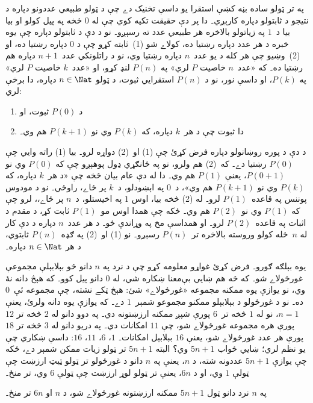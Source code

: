 \documentclass[../../../include/open-logic-section]{subfiles}
\begin{document}


په تر ټولو ساده بڼه کښې استقرا يو داسې تخنيک دے چې د ټولو
طبيعي عددونو دپاره د نتيجو د ثابتولو دپاره کارېږي۔ دا پر دې
حقيقت تکيه کوي چې له $0$ څخه په پيل کولو او بيا بيا د~$1$ په
زياتولو بالاخره هر طبيعي عدد ته رسېږو۔ نو د دې د ثابتولو
دپاره چې يوه خبره د هر عدد دپاره رښتيا ده، کولاے شو (1)~ثابته
کړو چې د $0$ دپاره رښتيا ده، او (2)~وښيو چې هر کله د يو
عدد~$n$ دپاره رښتيا وي، نو د راتلونکي عدد~$n+1$ دپاره هم
رښتيا ده۔ که «عدد~$n$ خاصيت $P$ لري» په $P(n)$ لنډ کړو، او
«عدد~$k$ خاصيت $P$ لري» په $P(k)$، او داسې نور، نو د $P(n)$
استقرايي ثبوت، د ټولو $n \in \Nat$ دپاره، دا برخې لري:
\begin{enumerate}
\item د $P(0)$ ثبوت، او
\item دا ثبوت چې د هر~$k$ دپاره، که $P(k)$ وي نو $P(k+1)$ هم وي۔
\end{enumerate}
د دې د پوره روښانولو دپاره فرض کړئ چې (1) او~(2) دواړه لرو۔
بيا (1) راته وايي چې $P(0)$ رښتيا دے۔ که~(2) هم ولرو، نو
په ځانګړي ډول پوهېږو چې که $P(0)$ وي نو $P(0+1)$، يعنې
$P(1)$ هم وي۔ دا له دې عام بيان څخه چې «د هر~$k$ دپاره، که
$P(k)$ وي نو $P(k+1)$ هم وي»، د~$0$ په اېښودلو، د~$k$ پر ځاے،
راوځي۔ نو د مودوس پوننس په قاعده~$P(1)$ لرو۔ له (2) څخه
بيا، اوس $1$ په اخيستلو، د~$n$ پر ځاے،، لرو چې که $P(1)$ وي
نو~$P(2)$ هم وي۔ ځکه چې همدا اوس مو~$P(1)$ ثابت کړ، د مقدم
د اثبات په قاعده~$P(2)$ لرو۔ او همداسې مخ په وړاندې ځو۔
د هر عدد~$n$ دپاره د دې کار له $n$~ځله کولو وروسته بالاخره
تر~$P(n)$ رسېږو۔ نو (1) او~(2) په ګډه~$P(n)$ ثابتوي، د هر $n
\in \Nat$ دپاره۔

يوه بېلګه ګورو۔ فرض کړئ غواړو معلومه کړو چې د نرد په $n$
دانو څو بېلابېلې مجموعې غورځولاے شو۔ که څه هم ښايي بې‌معنا
ښکاره شي، له $0$ دانو پيل کوو۔ که هېڅ دانه نۀ وي، نو يوازې
يوه ممکنه مجموعه «غورځولاے» شئ: هېڅ ټکے نشته، چې مجموعه ئې~$0$
ده۔ نو د غورځولو د بېلابېلو ممکنو مجموعو شمېر~$1$ دے۔ که
يوازې يوه دانه ولرئ، يعنې $n=1$، نو له $1$ څخه تر~$6$ پورې
شپږ ممکنه ارزښتونه دي۔ په دوو دانو له $2$ څخه تر $12$ پورې
هره مجموعه غورځولاے شو، چې $11$ امکانات دي۔ په دريو دانو
له $3$ څخه تر $18$ پورې هر عدد غورځولاے شو، يعنې $16$
بېلابېل امکانات۔ $1$، $6$، $11$، $16$: داسې ښکاري چې يو
نظم لري؛ ښايي ځواب $5n+1$ وي؟ البته $5n+1$ تر ټولو زيات
ممکن شمېر دے، ځکه چې يوازې $5n+1$ عددونه شته، د $n$، يعنې په $n$ دانو د غورځولو
تر ټولو ټيټ ارزښت چې ټولې $1$ وي، او د $6n$، يعنې تر ټولو
لوړ ارزښت چې ټولې $6$ وي، تر منځ۔

\begin{thm}
په $n$ نرد دانو ټول $5n+1$ ممکنه ارزښتونه غورځولاے شو،
د $n$ او $6n$ تر منځ۔
\end{thm}
\end{document}
